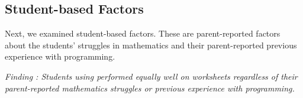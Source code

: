 

 
 \subsection{Student-based Factors}
 
 Next, we examined student-based factors. These are parent-reported factors about the students' struggles in mathematics and their parent-reported previous experience with programming.
 
 \textit{Finding : Students using \ts{} performed equally well on worksheets regardless of their parent-reported mathematics struggles or previous experience with programming.}
 
